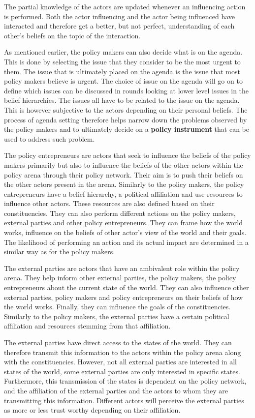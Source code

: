 \documentclass{article}
\begin{document}
The partial knowledge of the actors are updated whenever an influencing action is performed. Both the actor influencing and the actor being influenced have interacted and therefore get a better, but not perfect, understanding of each other’s beliefs on the topic of the interaction.

As mentioned earlier, the policy makers can also decide what is on the agenda. This is done by selecting the issue that they consider to be the most urgent to them. The issue that is ultimately placed on the agenda is the issue that most policy makers believe is urgent. The choice of issue on the agenda will go on to define which issues can be discussed in rounds looking at lower level issues in the belief hierarchies. The issues all have to be related to the issue on the agenda. This is however subjective to the actors depending on their personal beliefs. The process of agenda setting therefore helps narrow down the problems observed by the policy makers and to ultimately decide on a {\bfseries policy instrument} that can be used to address such problem.

The policy entrepreneurs are actors that seek to influence the beliefs of the policy makers primarily but also to influence the beliefs of the other actors within the policy arena through their policy network. Their aim is to push their beliefs on the other actors present in the arena. Similarly to the policy makers, the policy entrepreneurs have a belief hierarchy, a political affiliation and use resources to influence other actors. These resources are also defined based on their constituencies. They can also perform different actions on the policy makers, external parties and other policy entrepreneurs. They can frame how the world works, influence on the beliefs of other actor’s view of the world and their goals. The likelihood of performing an action and its actual impact are determined in a similar way as for the policy makers.

The external parties are actors that have an ambivalent role within the policy arena. They help inform other external parties, the policy makers, the policy entrepreneurs about the current state of the world. They can also influence other external parties, policy makers and policy entrepreneurs on their beliefs of how the world works. Finally, they can influence the goals of the constituencies. Similarly to the policy makers, the external parties have a certain political affiliation and resources stemming from that affiliation.

The external parties have direct access to the states of the world. They can therefore transmit this information to the actors within the policy arena along with the constituencies. However, not all external parties are interested in all states of the world, some external parties are only interested in specific states. Furthermore, this transmission of the states is dependent on the policy network, and the affiliation of the external parties and the actors to whom they are transmitting this information. Different actors will perceive the external parties as more or less trust worthy depending on their affiliation.
\end{document}
